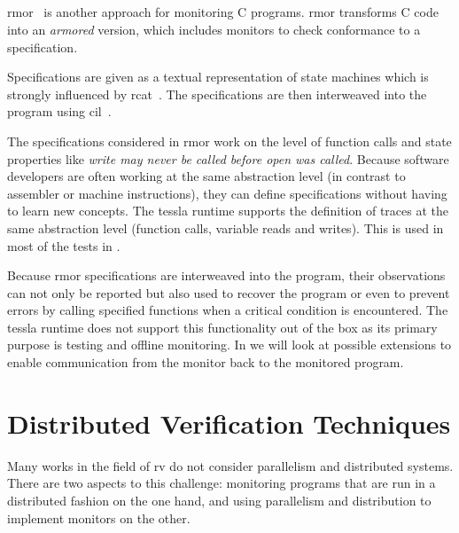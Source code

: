 \subsection{}
\label{sec:related:c_programs:rmor}

\gls{rmor}~\citep{Havelund2008} is another approach for monitoring C programs.
\gls{rmor} transforms C code into an \emph{armored} version, which includes monitors to check conformance to a specification.

Specifications are given as a textual representation of state machines which is strongly influenced by \gls{rcat}~\citep{Smith2008}.
The specifications are then interweaved into the program using \gls{cil}~\cite{Necula2002}.

The specifications considered in \gls{rmor} work on the level of function calls and state properties like \emph{write may never be called before open was called}.
Because software developers are often working at the same abstraction level (in contrast to assembler or machine instructions), they can define specifications without having to learn new concepts.
The \gls{tessla} runtime supports the definition of traces at the same abstraction level (function calls, variable reads and writes).
This is used in most of the tests in .

Because \gls{rmor} specifications are interweaved into the program, their observations can not only be reported but also used to recover the program or even to prevent errors by calling specified functions when a critical condition is encountered.
The \gls{tessla} runtime does not support this functionality out of the box as its primary purpose is testing and offline monitoring.
In  we will look at possible extensions to enable communication from the monitor back to the monitored program.

\section{Distributed Verification Techniques}
\label{sec:related:distributed}

Many works in the field of \gls{rv} do not consider parallelism and distributed systems.
There are two aspects to this challenge: monitoring programs that are run in a distributed fashion on the one hand, and using parallelism and distribution to implement monitors on the other.

